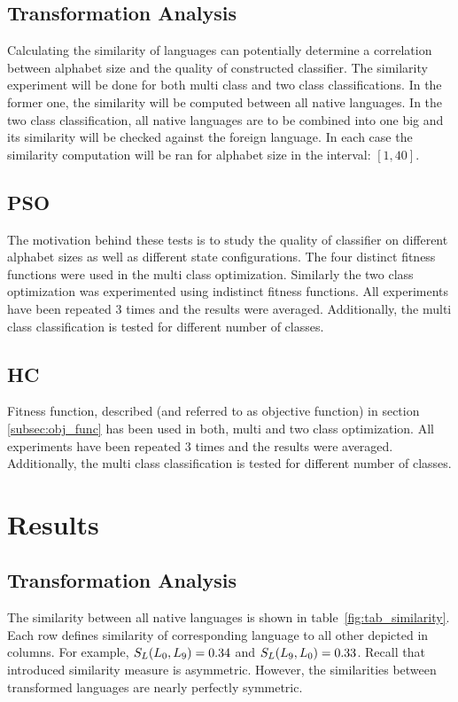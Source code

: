 \documentclass{mini}
\begin{document}
\section{Transformation Analysis}

Calculating the similarity of languages can potentially determine a correlation between alphabet size and the quality of constructed classifier. The similarity experiment will be done for both multi class and two class classifications. In the former one, the similarity will be computed between all native languages. In the two class classification, all native languages are to be combined into one big and its similarity will be checked against the foreign language. In each case the similarity computation will be ran for alphabet size in the interval: $[1,40]$.


\section{PSO}
The motivation behind these tests is to study the quality of classifier on different alphabet sizes as well as different state configurations. The four distinct fitness functions were used in the multi class optimization. Similarly the two class optimization was experimented using indistinct fitness functions. All experiments have been repeated $3$ times and the results were averaged. Additionally, the multi class classification is tested for different number of classes. 
\section{HC}
Fitness function, described (and referred to as objective function) in section \ref{subsec:obj_func} has been used in both, multi and two class optimization. All experiments have been repeated $3$ times and the results were averaged. Additionally, the multi class classification is tested for different number of classes.

\chapter{Results}\label{chap:results}

\section{Transformation Analysis}

The similarity between all native languages is shown in table~\ref{fig:tab_similarity}. Each row defines similarity of corresponding language to all other depicted in columns. For example, $S_{L}(L_0,L_9) = 0.34$ and $S_{L}(L_9,L_0) = 0.33$. Recall that introduced similarity measure is asymmetric. However, the similarities between transformed languages are nearly perfectly symmetric.
\end{document}
